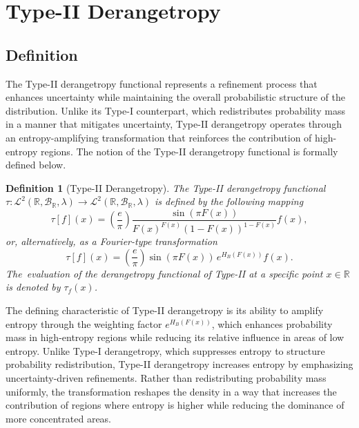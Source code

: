 \documentclass[sn-mathphys-num]{sn-jnl}%
\theoremstyle{thmstyleone}%
\theoremstyle{thmstyletwo}%
\theoremstyle{thmstylethree}%
\newtheorem{definition}{Definition}%
\begin{document}
\section{Type-II Derangetropy}
\label{Sec:Type-II}
\subsection{Definition}
The Type-II derangetropy functional represents a refinement process that enhances uncertainty while maintaining the overall probabilistic structure of the distribution. Unlike its Type-I counterpart, which redistributes probability mass in a manner that mitigates uncertainty, Type-II derangetropy operates through an entropy-amplifying transformation that reinforces the contribution of high-entropy regions. The notion of the Type-II derangetropy functional is formally defined below.


\begin{definition}[Type-II Derangetropy]
	\label{Def:TypeII}
	The \textit{Type-II derangetropy functional} $\tau: \mathcal{L}^2(\mathbb{R}, \mathscr{B}_{\mathbb{R}}, \lambda) \rightarrow \mathcal{L}^2(\mathbb{R}, \mathscr{B}_{\mathbb{R}}, \lambda)$ is defined by the following mapping
	\begin{equation}
		\tau[f](x) = \left(\frac{e}{\pi}\right) \dfrac{\sin(\pi F(x))}{F(x)^{F(x)} (1-F(x))^{1-F(x)}}   f(x),
	\end{equation}
	or, alternatively, as a Fourier-type transformation
	\begin{equation}
		\tau[f](x) = \left(\frac{e}{\pi}\right) \sin(\pi F(x))\,  e^{H_B(F(x))} f(x).
	\end{equation}
	The~evaluation of the derangetropy functional of Type-II at a specific point $x \in \mathbb{R}$ is denoted by $\tau_f(x)$.
\end{definition}

The defining characteristic of Type-II derangetropy is its ability to amplify entropy through the weighting factor $e^{H_B(F(x))}$, which enhances probability mass in high-entropy regions while reducing its relative influence in areas of low entropy. Unlike Type-I derangetropy, which suppresses entropy to structure probability redistribution, Type-II derangetropy increases entropy by emphasizing uncertainty-driven refinements. Rather than redistributing probability mass uniformly, the transformation reshapes the density in a way that increases the contribution of regions where entropy is higher while reducing the dominance of more concentrated areas.
\end{document}
